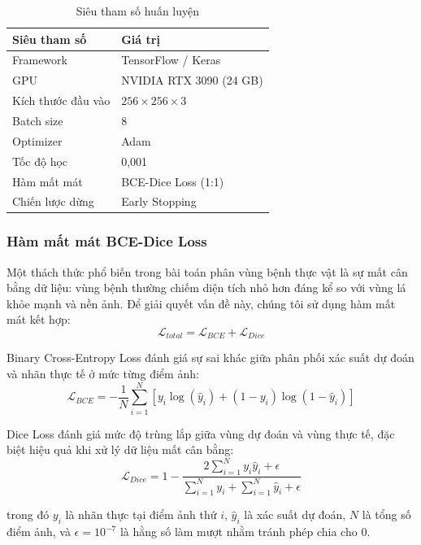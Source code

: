 \documentclass[conference]{IEEEtran}
\begin{document}
\begin{table}[htbp]
\centering
\caption{Siêu tham số huấn luyện}
\label{tab:hyperparams}
\begin{tabular}{ll}
\toprule
\textbf{Siêu tham số} & \textbf{Giá trị} \\
\midrule
Framework           & TensorFlow / Keras \\
GPU                 & NVIDIA RTX 3090 (24 GB) \\
Kích thước đầu vào  & $256 \times 256 \times 3$ \\
Batch size          & 8 \\
Optimizer           & Adam \\
Tốc độ học          & 0,001 \\
Hàm mất mát         & BCE-Dice Loss (1:1) \\
Chiến lược dừng     & Early Stopping \\
\bottomrule
\end{tabular}
\end{table}

\subsubsection{Hàm mất mát BCE-Dice Loss}

Một thách thức phổ biến trong bài toán phân vùng bệnh thực vật là sự mất cân bằng dữ liệu: vùng bệnh thường chiếm diện tích nhỏ hơn đáng kể so với vùng lá khỏe mạnh và nền ảnh. Để giải quyết vấn đề này, chúng tôi sử dụng hàm mất mát kết hợp:
\begin{equation}
\mathcal{L}_{total} = \mathcal{L}_{BCE} + \mathcal{L}_{Dice}
\end{equation}

Binary Cross-Entropy Loss đánh giá sự sai khác giữa phân phối xác suất dự đoán và nhãn thực tế ở mức từng điểm ảnh:
\begin{equation}
\mathcal{L}_{BCE} = -\frac{1}{N}\sum_{i=1}^{N}\left[y_i \log(\hat{y}_i) + (1 - y_i) \log(1 - \hat{y}_i)\right]
\end{equation}

Dice Loss đánh giá mức độ trùng lắp giữa vùng dự đoán và vùng thực tế, đặc biệt hiệu quả khi xử lý dữ liệu mất cân bằng:
\begin{equation}
\mathcal{L}_{Dice} = 1 - \frac{2\sum_{i=1}^{N} y_i \hat{y}_i + \epsilon}{\sum_{i=1}^{N} y_i + \sum_{i=1}^{N} \hat{y}_i + \epsilon}
\end{equation}

trong đó $y_i$ là nhãn thực tại điểm ảnh thứ $i$, $\hat{y}_i$ là xác suất dự đoán, $N$ là tổng số điểm ảnh, và $\epsilon = 10^{-7}$ là hằng số làm mượt nhằm tránh phép chia cho 0.
\end{document}
